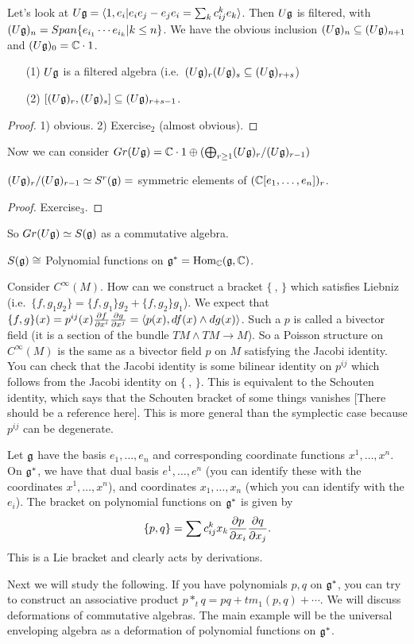   Let's look at $U\mathfrak{g} = \langle 1,e_i|e_ie_j-e_je_i = \sum_k c^k_{ij} e_k\rangle$. Then
  $U\mathfrak{g}$ is filtered, with $(U\mathfrak{g})_n = Span\{e_{i_1}\cdots e_{i_k}|k\le n\}$. We have
  the obvious inclusion $(U\mathfrak{g})_n\subseteq (U\mathfrak{g})_{n+1}$ and $(U\mathfrak{g})_0=\mathbb{C}\cdot 1$.
  \begin{proposition}
    \begin{itemize}
    \item[]
    \item[(1)] $U\mathfrak{g}$ is a filtered algebra (i.e.\ $(U\mathfrak{g})_r(U\mathfrak{g})_s\subseteq
    (U\mathfrak{g})_{r+s}$)
    \item[(2)] $[(U\mathfrak{g})_r,(U\mathfrak{g})_s]\subseteq (U\mathfrak{g})_{r+s-1}$.
    \end{itemize}
  \end{proposition}
  \begin{proof}
    1) obvious. 2) Exercise$_2$ (almost obvious).
  \end{proof}

  Now we can consider $Gr(U\mathfrak{g}) = \mathbb{C}\cdot 1\oplus (\bigoplus_{r\ge 1}
  (U\mathfrak{g})_r/(U\mathfrak{g})_{r-1})$
  \begin{claim}
    $(U\mathfrak{g})_r/(U\mathfrak{g})_{r-1} \simeq S^r(\mathfrak{g}) = $ symmetric elements of $(\mathbb{C}[e_1,\dots, e_n])_r$.
  \end{claim}
  \begin{proof}
    Exercise$_3$.
  \end{proof}
  So $Gr(U\mathfrak{g})\simeq S(\mathfrak{g})$ as a commutative algebra.

 $S(\mathfrak{g}) \cong $ Polynomial functions on $\mathfrak{g}^* = \operatorname{Hom}_{\mathbb{C}}(\mathfrak{g},\mathbb{C})$.

 Consider $C^\infty(M)$. How can we construct a bracket $\{\ ,\,\}$ which satisfies
 Liebniz (i.e.\ $\{f,g_1g_2\}=\{f,g_1\}g_2+\{f,g_2\}g_1$). We expect that $\{f,g\}(x)=
 p^{ij}(x)\frac{\partial f}{\partial x^i}\frac{\partial g}{\partial x^j} = \langle p(x),df(x)\wedge dg(x)\rangle$. Such a
 $p$ is called a bivector field (it is a section of the bundle $TM\wedge TM\to M$). So
 a Poisson structure on $C^\infty(M)$ is the same as a bivector field $p$ on $M$
 satisfying the Jacobi identity. You can check that the Jacobi identity is some
 bilinear identity on $p^{ij}$ which follows from the Jacobi identity on $\{\ ,\,\}$.
 This is equivalent to the Schouten identity, which says that the Schouten bracket of
 some things vanishes [There should be a reference here]. This is more general than
 the symplectic case because $p^{ij}$ can be degenerate.

 Let $\mathfrak{g}$ have the basis $e_1,\dots, e_n$ and corresponding coordinate functions
 $x^1,\dots, x^n$. On $\mathfrak{g}^*$, we have that dual basis $e^1,\dots, e^n$ (you can
 identify these with the coordinates $x^1,\dots, x^n$), and coordinates $x_1,\dots,
 x_n$ (which you can identify with the $e_i$). The bracket on polynomial functions on
 $\mathfrak{g}^*$ is given by
 \[
    \{p,q\} = \sum c_{ij}^k x_k \frac{\partial p}{\partial x_i}\frac{\partial q}{\partial x_j}.
 \]
 This is a Lie bracket and clearly acts by derivations.

 Next we will study the following. If you have polynomials $p,q$ on $\mathfrak{g}^*$, you can
 try to construct an associative product $p\ast_t q = pq+tm_1(p,q)+\cdots$. We will
 discuss deformations of commutative algebras. The main example will be the universal
 enveloping algebra as a deformation of polynomial functions on $\mathfrak{g}^*$.
